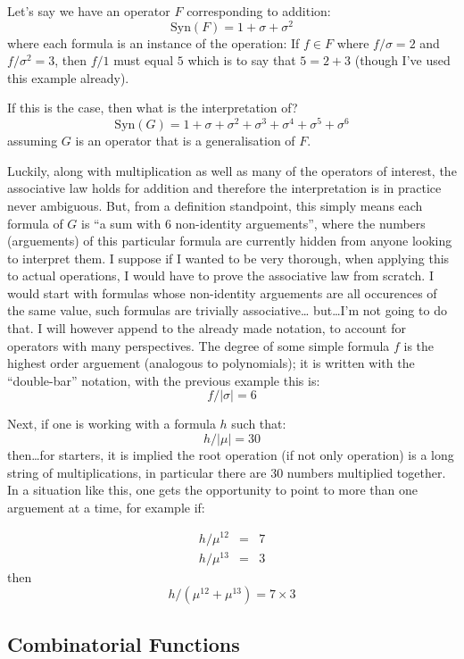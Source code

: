 \documentclass[twoside]{article}
\begin{document}
Let's say we have an operator $ F $ corresponding to addition:
$$ \mbox{Syn}(F)=1+\sigma+\sigma^2 $$
where each formula is an instance of the operation:  If $ f\in F $ where $ f/\sigma=2 $ and $ f/\sigma^2=3 $, then
$ f/1 $ must equal $ 5 $ which is to say that $ 5=2+3 $ (though I've used this example already).

If this is the case, then what is the interpretation of?
$$ \mbox{Syn}(G)=1+\sigma+\sigma^2+\sigma^3+\sigma^4+\sigma^5+\sigma^6 $$
assuming $ G $ is an operator that is a generalisation of $ F $.

Luckily, along with multiplication as well as many of the operators of interest, the associative law holds for addition
and therefore the interpretation is in practice never ambiguous.  But, from a definition standpoint, this simply means
each formula of $ G $ is ``a sum with $ 6 $ non-identity arguements'', where the numbers (arguements) of this particular
formula are currently hidden from anyone looking to interpret them.  I suppose if I wanted to be very thorough, when
applying this to actual operations, I would have to prove the associative law from scratch.  I would start with formulas
whose non-identity arguements are all occurences of the same value, such formulas are trivially associative\ldots
but\ldots I'm not going to do that.  I will however append to the already made notation, to account for operators with
many perspectives.  The degree of some simple formula $ f $ is the highest order arguement (analogous to polynomials);
it is written with the ``double-bar'' notation, with the previous example this is:
$$ f/|\sigma|=6 $$

Next, if one is working with a formula $ h $ such that:
$$ h/|\mu|=30 $$
then\ldots for starters, it is implied the root operation (if not only operation) is a long string of multiplications,
in particular there are 30 numbers multiplied together.  In a situation like this, one gets the opportunity to point
to more than one arguement at a time, for example if:

\begin{eqnarray*}
h/\mu^{12} & = & 7\\
h/\mu^{13} & = & 3
\end{eqnarray*}
then
$$ h/(\mu^{12}+\mu^{13})=7\times 3 $$

\subsection{Combinatorial Functions}
\end{document}
